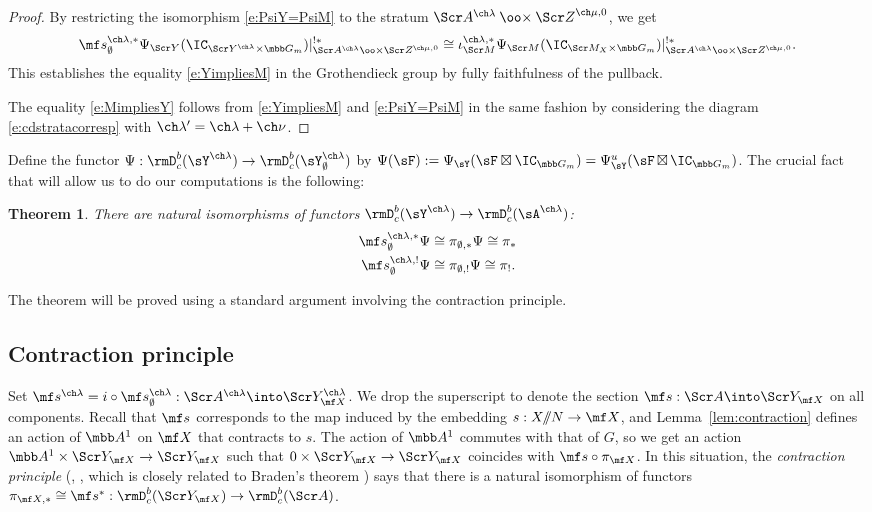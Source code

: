 \documentclass[final]{amsart}
\newtheorem{thm}[subsubsection]{Theorem}
\theoremstyle{remark}
\theoremstyle{definition}
\DeclareMathOperator*{\bt}{\boxtimes}
\numberwithin{equation}{section}
\begin{document}
\begin{proof}
By restricting the isomorphism \eqref{e:PsiY=PsiM} to the stratum
$\Scr A^{\ch\lambda} \mathbin{\oo\times} {\Scr Z}^{\ch\mu,0}$, we get 
\[
    \mf s_\emptyset^{\ch\lambda,*}\Psi_{\Scr Y}(\IC_{\Scr Y^{\ch\lambda}\times\mbb G_m})|^{!*}_{\Scr A^{\ch\lambda} \oo\times {\Scr Z}^{\ch\mu,0}} \cong \iota^{\ch\lambda,*}_{\Scr M}\Psi_{\Scr M}(\IC_{\Scr M_X\times \mbb G_m})|^{!*}_{\Scr A^{\ch\lambda} \oo\times {\Scr Z}^{\ch\mu,0}}. 
\]
This establishes the equality \eqref{e:YimpliesM} in the Grothendieck group
by fully faithfulness of the pullback.

The equality \eqref{e:MimpliesY} follows from \eqref{e:YimpliesM} and \eqref{e:PsiY=PsiM}
in the same fashion by considering the diagram \eqref{e:cdstratacorresp} with 
$\ch\lambda'=\ch\lambda+\ch\nu$.
\end{proof}

Define the functor $\Psi : \rmD^b_c(\sY^{\ch\lambda}) \to \rmD^b_c(\sY^{\ch\lambda}_\emptyset)$
by $\Psi(\sF) := \Psi_\sY(\sF \boxtimes \IC_{\mbb G_m}) = \Psi_\sY^u(\sF \bt \IC_{\mbb G_m})$. 
The crucial fact that will allow us to do our computations is the following: 

\begin{thm} \label{thm:PsiRadon}
There are natural isomorphisms of functors $\rmD^b_c(\sY^{\ch\lambda}) \to \rmD^b_c(\sA^{\ch\lambda})$:  
\begin{align*} 
\mf s^{\ch\lambda,*}_\emptyset \Psi 
&\cong \pi_{\emptyset,*}\Psi
\cong \pi_*  \\
\mf s^{\ch\lambda,!}_\emptyset \Psi 
&\cong \pi_{\emptyset,!}\Psi \cong \pi_!. 
\end{align*}
\end{thm}

The theorem will be proved using a standard argument
involving the contraction principle. 


\subsection{Contraction principle}

Set $\mf s^{\ch\lambda} = i \circ \mf s^{\ch\lambda}_\emptyset : \Scr A^{\ch\lambda} \into \Scr Y_{\mf X}^{\ch\lambda}$. 
We drop the superscript to denote the section $\mf s : \Scr A \into \Scr Y_{\mf X}$
on all components.
Recall that $\mf s$ corresponds to the map induced by 
the embedding $s : X/\!\!/N \to \mf X$,
and Lemma~\ref{lem:contraction} defines an action of $\mbb A^1$ on $\mf X$
that contracts to $s$. 
The action of $\mbb A^1$ commutes with that of $G$, so we get an action 
$\mbb A^1 \times \Scr Y_{\mf X} \to \Scr Y_{\mf X}$
such that $0 \times \Scr Y_{\mf X} \to\Scr Y_{\mf X}$ coincides with 
$\mf s \circ \pi_{\mf X}$. 
In this situation, the \emph{contraction principle} (\cite[Lemma 5.3]{BFGM}, 
\cite[Lemme 2.2]{VLaff}, which is closely related to Braden's theorem \cite{Braden}) says that 
there is a natural isomorphism of functors $\pi_{\mf X,*} \cong \mf s^* : \rmD^b_c(\Scr Y_{\mf X}) \to \rmD^b_c(\Scr A)$. 
\end{document}
